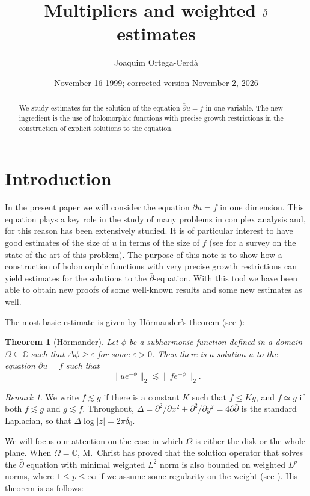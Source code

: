 \documentclass[12pt,twoside,final,psamsfonts]{amsart}
\title{Multipliers and weighted $\dbar$ estimates}
\author{Joaquim Ortega-Cerd\`a}
\date{November 16 1999; corrected version November 2, 2026}
\theoremstyle{plain}
\newtheorem*{teor*}{Theorem}
\theoremstyle{remark}
\newtheorem*{remark}{Remark}
\theoremstyle{definition}
\newcommand{\C}{{\mathbb C}}
\newcommand{\dbar}{\bar\partial}
\begin{document}
 

\begin{abstract} 
We study estimates for the solution of the equation $\dbar u=f$ in one
variable. The new ingredient is the use of holomorphic functions with precise
growth restrictions in the construction of explicit solutions to the equation.
\end{abstract}

\maketitle
\section{Introduction}  
In the present paper we will consider the equation $\dbar u =f$ in one
dimension. This equation plays a key role in the study of many problems in
complex analysis and, for this reason has been extensively studied. It is of
particular interest to have good estimates of the size of $u$ in terms of the
size of $f$ (see \cite{Berndtsson94} for a survey on the state of the art of
this problem). The purpose of this note is to show how a construction of
holomorphic functions with very precise growth restrictions can yield estimates
for the solutions to the $\dbar$-equation. With this tool we have been able to
obtain new proofs of some well-known results and some new estimates as well.

The most basic estimate is given by H\"ormander's theorem 
(see \cite[p.~92]{Hormander90a}):

\begin{teor*}[H\"ormander] 
Let $\phi$ be a subharmonic function defined in a
domain $\Omega\subseteq \C$ such that $\Delta \phi \ge \varepsilon$ for some
$\varepsilon>0$. Then there is  a solution $u$ to the equation $\dbar u=f$ such
that 
\[ \|ue^{-\phi}\|_2\lesssim \|fe^{-\phi}\|_2. 
\] 
\end{teor*}

\begin{remark} We write $f\lesssim g$ if there is a constant $K$ such that
$f\le K g$, and $f\simeq g$ if both $f\lesssim g$ and $g\lesssim f$.
Throughout, $\Delta=\partial^2/\partial x^2+\partial^2/\partial y^2=4\partial\dbar$
is the standard Laplacian, so that $\Delta\log|z|=2\pi\delta_0$.
\end{remark}

We will focus our attention on the case in which $\Omega$ is either the disk or
the whole plane. When $\Omega=\C$, M.~Christ has proved that the 
solution operator that solves the $\dbar$ equation with minimal weighted $L^2$
norm is also bounded  on weighted $L^p$ norms, where $1\le p\le \infty$ if we
assume some regularity on the weight (see \cite{Christ91}). His theorem is as
follows:
\end{document}
